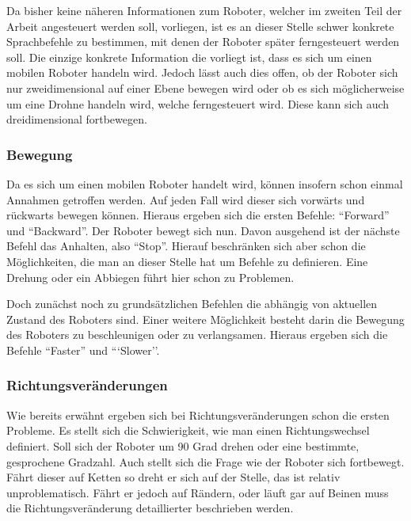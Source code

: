 Da bisher keine n\"aheren Informationen zum Roboter, welcher im zweiten Teil der Arbeit angesteuert werden soll, vorliegen, ist es an dieser Stelle schwer 
konkrete Sprachbefehle zu bestimmen, mit denen der Roboter sp\"ater ferngesteuert werden soll.
Die einzige konkrete Information die vorliegt ist, dass es sich um einen mobilen Roboter handeln wird. 
Jedoch l\"asst auch dies offen, ob der Roboter sich nur zweidimensional auf einer Ebene bewegen wird oder ob es sich m\"oglicherweise um eine Drohne 
handeln wird, welche ferngesteuert wird. Diese kann sich auch dreidimensional fortbewegen.
\par\smallskip 

\subsubsection{Bewegung}

Da es sich um einen mobilen Roboter handelt wird, k\"onnen insofern schon einmal Annahmen getroffen werden. Auf jeden Fall wird dieser sich vorw\"arts 
und r\"uckwarts bewegen k\"onnen. Hieraus ergeben sich die ersten Befehle: ``Forward'' und ``Backward''. Der Roboter bewegt sich nun. Davon ausgehend 
ist der n\"achste Befehl das Anhalten, also ``Stop''. Hierauf beschr\"anken sich aber schon die M\"oglichkeiten, die man an dieser Stelle hat um 
Befehle zu definieren. Eine Drehung oder ein Abbiegen f\"uhrt hier schon zu Problemen. 

Doch zun\"achst noch zu grunds\"atzlichen Befehlen die abh\"angig von aktuellen Zustand des Roboters sind. Einer weitere M\"oglichkeit besteht 
darin die Bewegung des Roboters zu beschleunigen oder zu verlangsamen. Hieraus ergeben sich die Befehle ``Faster'' und ```Slower''.


\subsubsection{Richtungsver\"anderungen}

Wie bereits erw\"ahnt ergeben sich bei Richtungsver\"anderungen schon die ersten Probleme. Es stellt sich die Schwierigkeit, wie man einen 
Richtungswechsel definiert. Soll sich der Roboter um 90 Grad drehen oder eine bestimmte, gesprochene Gradzahl. Auch stellt sich die Frage wie 
der Roboter sich fortbewegt. F\"ahrt dieser auf Ketten so dreht er sich auf der Stelle, das ist relativ unproblematisch. F\"ahrt er jedoch 
auf R\"andern, oder l\"auft gar auf Beinen muss die Richtungsver\"anderung detaillierter beschrieben werden. 

